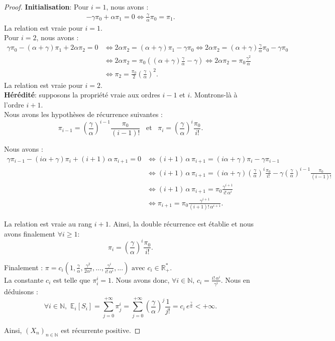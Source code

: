 \documentclass[12pt,a4paper]{report}
\theoremstyle{remark}
\begin{document}
\begin{proof}
\textbf{Initialisation}: Pour $i=1$, nous avons :
\begin{align*}
 -\gamma\pi_0+\alpha\pi_1 = 0 \iff  \frac{\gamma}{\alpha}\pi_0=\pi_1.
\end{align*}
La relation est vraie pour $i=1$.\\

Pour $i=2$, nous avons :
\begin{align*}
 \gamma\pi_{0}-(\alpha + \gamma)\pi_{1}+2\alpha\pi_{2} = 0 &\iff 2\alpha\pi_{2}=(\alpha + \gamma)\pi_{1}- \gamma\pi_{0} \iff 2\alpha\pi_{2}=(\alpha + \gamma)\frac{\gamma}{\alpha}\pi_0- \gamma\pi_{0}\\
 &\iff  2\alpha\pi_{2}=\pi_0((\alpha + \gamma)\frac{\gamma}{\alpha}- \gamma ) \iff 2\alpha\pi_{2}=\pi_0\frac{\gamma^2}{\alpha} \\
 &\iff \pi_{2}=\frac{\pi_0}{2}\left(\frac{\gamma}{\alpha}\right)^2.
\end{align*}
La relation est vraie pour $i=2$.\\

\textbf{Hérédité}: supposons la propriété vraie aux ordres $i-1$ et $i$. Montrons-là à l'ordre $i+1$.\\

Nous avons les hypothèses de récurrence suivantes : 
$$\pi_{i-1} = \left(\frac{\gamma}{\alpha}\right)^{i-1}\frac{\pi_0}{(i-1)!} \, \, \, \text{ et } \, \, \, \pi_i = \left(\frac{\gamma}{\alpha}\right)^{i}\frac{\pi_0}{i!}.$$

Nous avons : 
\begin{align*}
 \gamma\pi_{i-1}-(i\alpha + \gamma)\pi_{i}+(i+1) \, \alpha \, \pi_{i+1} = 0
 &\iff  (i+1) \, \alpha \, \pi_{i+1}=(i\alpha + \gamma)\pi_{i}- \gamma\pi_{i-1} \\
 &\iff  (i+1) \, \alpha \, \pi_{i+1}=(i\alpha + \gamma)\left(\frac{\gamma}{\alpha}\right)^{i}\frac{\pi_0}{i!}- \gamma\left(\frac{\gamma}{\alpha}\right)^{i-1}\frac{\pi_0}{(i-1)!}\\
&\iff (i+1) \, \alpha \, \pi_{i+1}=\pi_0\frac{\gamma^{i+1}}{i! \, \alpha^{i}}  \\
&\iff \pi_{i+1}=\pi_0\frac{\gamma^{i+1}}{(i+1)! \, \alpha^{i+1}}.
\end{align*}
 
La relation est vraie au rang $i+1$. Ainsi, la double récurrence est établie et nous avons finalement $\forall i \geqslant 1$:
$$\pi_i = \left(\frac{\gamma}{\alpha}\right)^{i}\frac{\pi_0}{i!}.$$

Finalement : $\pi = c_i \left(1, \frac{\gamma}{\alpha}, \frac{\gamma^2}{2 \alpha^2},...,\frac{\gamma^i}{i! \,  \alpha^i},... \right) \text{ avec } c_i \in \mathbb{R}_+^{*}.$ \\

La constante $c_i$ est telle que $\pi_i^i = 1$. Nous avons donc, $\forall i \in \mathbb{N}, \, c_i = \frac{i! \, \alpha^i}{\gamma^i}$. Nous en déduisons :
$$\forall i \in \mathbb{N}, \, \, \mathbb{E}_i[S_i] = \sum\limits_{j=0}^{+\infty} \pi_j^i =  \sum\limits_{j=0}^{+\infty} \left(\frac{\gamma}{\alpha}\right)^j \frac{1}{j!} = c_i \, e^{\frac{\gamma}{\alpha}} < +\infty.$$

Ainsi, $(X_n)_{n \in \mathbb{N}}$ est récurrente positive.
\end{proof}
\end{document}
